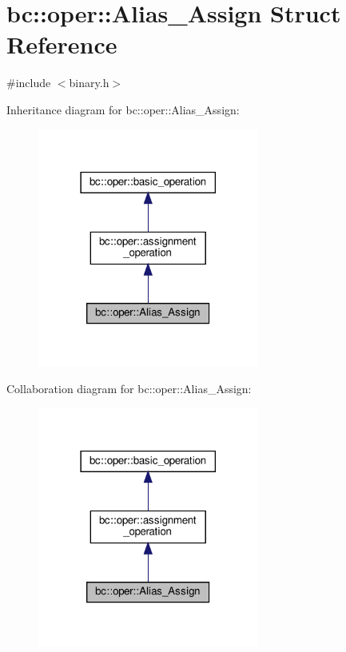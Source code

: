 \hypertarget{structbc_1_1oper_1_1Alias__Assign}{}\section{bc\+:\+:oper\+:\+:Alias\+\_\+\+Assign Struct Reference}
\label{structbc_1_1oper_1_1Alias__Assign}


{\ttfamily \#include $<$binary.\+h$>$}



Inheritance diagram for bc\+:\+:oper\+:\+:Alias\+\_\+\+Assign\+:\nopagebreak
\begin{figure}[H]
\begin{center}
\leavevmode
\includegraphics[width=206pt]{structbc_1_1oper_1_1Alias__Assign__inherit__graph}
\end{center}
\end{figure}


Collaboration diagram for bc\+:\+:oper\+:\+:Alias\+\_\+\+Assign\+:\nopagebreak
\begin{figure}[H]
\begin{center}
\leavevmode
\includegraphics[width=206pt]{structbc_1_1oper_1_1Alias__Assign__coll__graph}
\end{center}
\end{figure}
